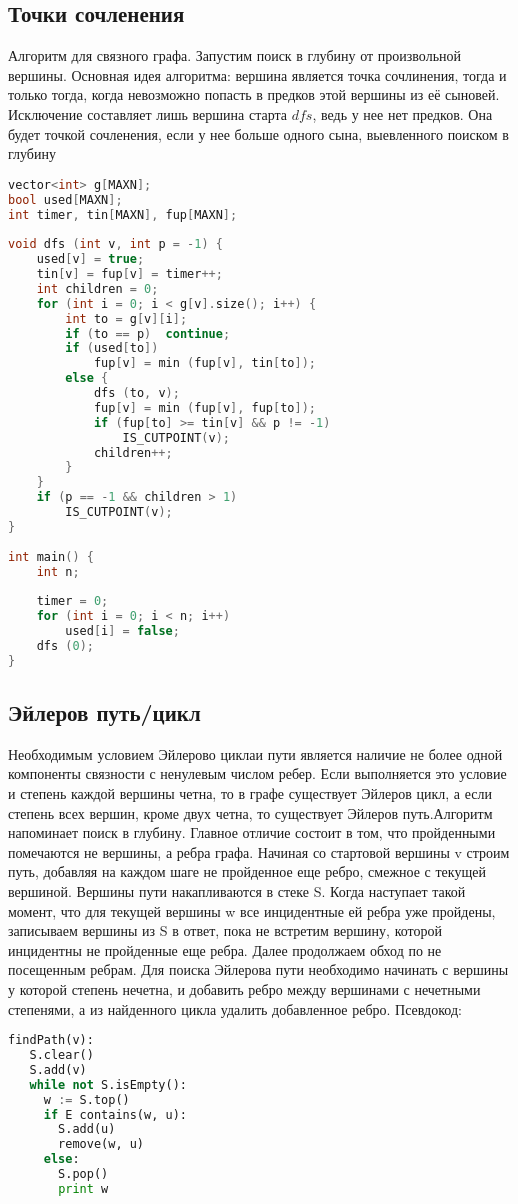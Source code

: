 \subsection{Точки сочленения}
Алгоритм для связного графа. Запустим поиск в глубину от произвольной вершины. Основная идея алгоритма: вершина является точка сочлинения, тогда и только тогда, когда невозможно попасть в предков этой вершины из её сыновей. Исключение составляет лишь вершина старта $dfs$, ведь у нее нет предков. Она будет точкой сочленения, если у нее больше одного сына, выевленного поиском в глубину
\begin{lstlisting}[language=C++]
vector<int> g[MAXN];
bool used[MAXN];
int timer, tin[MAXN], fup[MAXN];
 
void dfs (int v, int p = -1) {
	used[v] = true;
	tin[v] = fup[v] = timer++;
	int children = 0;
	for (int i = 0; i < g[v].size(); i++) {
		int to = g[v][i];
		if (to == p)  continue;
		if (used[to])
			fup[v] = min (fup[v], tin[to]);
		else {
			dfs (to, v);
			fup[v] = min (fup[v], fup[to]);
			if (fup[to] >= tin[v] && p != -1)
				IS_CUTPOINT(v);
			children++;
		}
	}
	if (p == -1 && children > 1)
		IS_CUTPOINT(v);
}
 
int main() {
	int n;
 
	timer = 0;
	for (int i = 0; i < n; i++)
		used[i] = false;
	dfs (0);
}
\end{lstlisting}
\subsection{Эйлеров путь/цикл}
Необходимым условием Эйлерово циклаи пути является наличие не более одной компоненты связности с ненулевым числом ребер. Если выполняется это условие и степень каждой вершины четна, то в графе существует Эйлеров цикл, а если степень всех вершин, кроме двух четна, то существует Эйлеров путь.Алгоритм напоминает поиск в глубину. Главное отличие состоит в том, что пройденными помечаются не вершины, а ребра графа. Начиная со стартовой вершины v строим путь, добавляя на каждом шаге не пройденное еще ребро, смежное с текущей вершиной. Вершины пути накапливаются в стеке S. Когда наступает такой момент, что для текущей вершины w все инцидентные ей ребра уже пройдены, записываем вершины из S в ответ, пока не встретим вершину, которой инцидентны не пройденные еще ребра. Далее продолжаем обход по не посещенным ребрам. Для поиска Эйлерова пути необходимо начинать с вершины у которой степень нечетна, и добавить ребро между вершинами с нечетными степенями, а из найденного цикла удалить добавленное ребро. Псевдокод:
\begin{lstlisting}[language=Python]
findPath(v):
   S.clear()
   S.add(v)
   while not S.isEmpty():
     w := S.top()
     if E contains(w, u):
       S.add(u)
       remove(w, u)
     else:
       S.pop()
       print w
\end{lstlisting}
